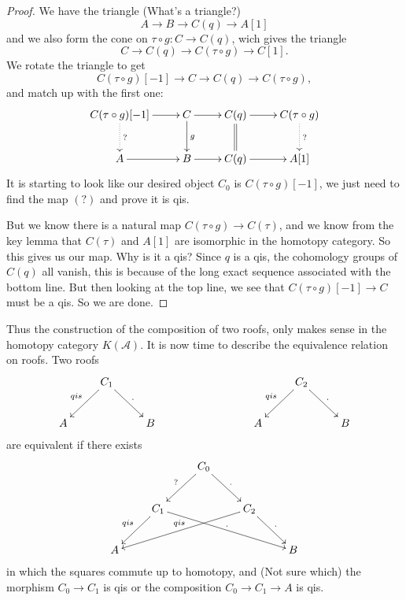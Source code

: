 \documentclass[12pt]{article}
\theoremstyle{plain}
\theoremstyle{definition}
\numberwithin{equation}{section}
\newcommand{\CA}{\mathcal{A}}
\begin{document}
\begin{proof}
We have the triangle ({\color{red}What's a triangle?})
\[
A \rightarrow B \rightarrow C(q) \rightarrow A[1]
\]
and we also form the cone on $\tau \circ g : C \rightarrow C(q)$, wich gives the triangle
\[
C \rightarrow C(q) \rightarrow C(\tau \circ g) \rightarrow C[1].
\]
We rotate the triangle to get
\[
C(\tau \circ g)[-1] \rightarrow C \rightarrow C(q) \rightarrow  C(\tau \circ g),
\]
and match up with the first one:
\begin{align*}
\xymatrix{
C(\tau \circ g)[-1] \ar@{->}[r]_{} \ar@{.>}[d]^{?} & C \ar@{->}[r]_{} \ar@{->}[d]^{g} & C(q) \ar@{->}[r]_{} \ar@{=}[d] & C(\tau \circ g) \ar@{.>}[d]^{?} \\
%
A \ar@{->}[r]_{} & B \ar@{->}[r]_{} & C(q) \ar@{->}[r]_{} & A[1]
}
\end{align*}
It is starting to look like our desired object $C_0$ is $C(\tau \circ g)[-1]$, we just need to find the map $(?)$ and prove it is qis.

But we know there is a natural map $C(\tau \circ g) \rightarrow C(\tau)$, and we know from the key lemma that $C(\tau)$ and $A[1]$ are isomorphic in the homotopy category. So this gives us our map. Why is it a qis? Since $q$ is a qis, the cohomology groups of $C(q)$ all vanish, this is because of the long exact sequence associated with the bottom line. But then looking at the top line, we see that $C(\tau \circ g)[-1] \rightarrow C$ must be a qis. So we are done.
\end{proof}

Thus the construction of the composition of two roofs, only makes sense in the homotopy category $K(\CA)$. It is now time to describe the equivalence relation on roofs. Two roofs
\begin{align*}
\xymatrix{
 & C_1 \ar@{->}[dl]_{qis} \ar@{->}[dr]^{.} & &&& & C_2 \ar@{->}[dl]_{qis} \ar@{->}[dr]^{.}\\
%
A & & B & & & A & & B \\
}
\end{align*}
are equivalent if there exists
\begin{align*}
\xymatrix{
 & & C_0 \ar@{->}[dl]_{?} \ar@{->}[dr]^{.} & \\
%
 & C_1 \ar@{->}[dl]_{qis} \ar@{->}[drrr]^{.} & & C_2 \ar@{->}[dlll]_{qis} \ar@{->}[dr]^{.} \\
%
A & & & & B \\
}
\end{align*}
in which the squares commute up to homotopy, and {(\color{red}Not sure which)} the morphism $C_0 \rightarrow C_1$ is qis or the composition $C_0 \rightarrow C_1 \rightarrow A$ is qis.
\end{document}
